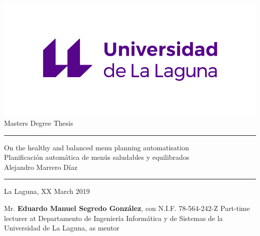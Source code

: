 \documentclass[english,a4paper,14pt,oneside]{extreport}
\begin{document}

\pagestyle{empty}
\thispagestyle{empty}


\newcommand{\HRule}{\rule{\linewidth}{1mm}}
\setlength{\parindent}{0mm}
\setlength{\parskip}{0mm}


\begin{center}
\includegraphics[scale=1.5]{images/marca.png}\\[10mm]
{\Huge Masters Degree Thesis}
\end{center}

\HRule
\begin{flushright}
        {\Huge On the healthy and balanced menu planning automatisation} \\[2.5mm]
        {\Large Planificación automática de menús saludables y equilibrados}\\[2.5mm]
        {\Large Alejandro Marrero Díaz} \\[5mm]


\end{flushright}
\HRule
{}
\begin{center}
  \Large La Laguna, XX March 2019
\end{center}

\setlength{\parindent}{5mm}

\newpage
\thispagestyle{empty}

Mr. {\bf Eduardo Manuel Segredo González}, con N.I.F. 78-564-242-Z
Part-time lecturer at Departamento 
de Ingeniería Informática y de Sistemas
de la Universidad de La Laguna, as mentor
\end{document}
